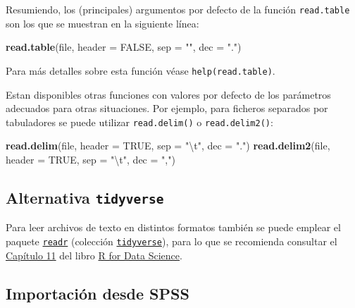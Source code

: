 \documentclass[]{book}
\newenvironment{Shaded}{\begin{snugshade}}{\end{snugshade}}
\newcommand{\CharTok}[1]{\textcolor[rgb]{0.31,0.60,0.02}{#1}}
\newcommand{\DataTypeTok}[1]{\textcolor[rgb]{0.13,0.29,0.53}{#1}}
\newcommand{\KeywordTok}[1]{\textcolor[rgb]{0.13,0.29,0.53}{\textbf{#1}}}
\newcommand{\NormalTok}[1]{#1}
\newcommand{\OtherTok}[1]{\textcolor[rgb]{0.56,0.35,0.01}{#1}}
\newcommand{\StringTok}[1]{\textcolor[rgb]{0.31,0.60,0.02}{#1}}
\begin{document}
Resumiendo, los (principales) argumentos por defecto de la función
\texttt{read.table} son los que se muestran en la siguiente línea:

\begin{Shaded}
\begin{Highlighting}[]
\KeywordTok{read.table}\NormalTok{(file, }\DataTypeTok{header =} \OtherTok{FALSE}\NormalTok{, }\DataTypeTok{sep =} \StringTok{""}\NormalTok{, }\DataTypeTok{dec =} \StringTok{"."}\NormalTok{)  }
\end{Highlighting}
\end{Shaded}

Para más detalles sobre esta función véase
\texttt{help(read.table)}.

Estan disponibles otras funciones con valores por defecto de los parámetros
adecuados para otras situaciones. Por ejemplo, para ficheros separados por tabuladores
se puede utilizar \texttt{read.delim()} o \texttt{read.delim2()}:

\begin{Shaded}
\begin{Highlighting}[]
\KeywordTok{read.delim}\NormalTok{(file, }\DataTypeTok{header =} \OtherTok{TRUE}\NormalTok{, }\DataTypeTok{sep =} \StringTok{"}\CharTok{\textbackslash{}t}\StringTok{"}\NormalTok{, }\DataTypeTok{dec =} \StringTok{"."}\NormalTok{)}
\KeywordTok{read.delim2}\NormalTok{(file, }\DataTypeTok{header =} \OtherTok{TRUE}\NormalTok{, }\DataTypeTok{sep =} \StringTok{"}\CharTok{\textbackslash{}t}\StringTok{"}\NormalTok{, }\DataTypeTok{dec =} \StringTok{","}\NormalTok{)}
\end{Highlighting}
\end{Shaded}

\hypertarget{alternativa-tidyverse}{%
\subsection{\texorpdfstring{Alternativa \texttt{tidyverse}}{Alternativa tidyverse}}\label{alternativa-tidyverse}}

Para leer archivos de texto en distintos formatos también se puede emplear el paquete \href{https://readr.tidyverse.org}{\texttt{readr}}
(colección \href{https://www.tidyverse.org/}{\texttt{tidyverse}}), para lo que se recomienda
consultar el \href{https://r4ds.had.co.nz/data-import.html}{Capítulo 11} del libro \href{http://r4ds.had.co.nz}{R for Data Science}.

\hypertarget{importacion-desde-spss}{%
\subsection{Importación desde SPSS}\label{importacion-desde-spss}}
\end{document}
